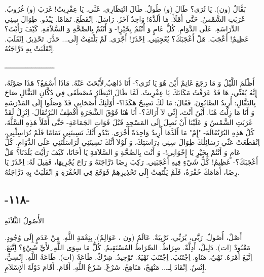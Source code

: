 \documentclass[a5paper]{article}
\begin{document}
بَقَّالٌ (ون). يَا تُرَى؟ طَالَ (و) طُولٌ. طَالَ انْتِظَارِي. غَنَّى. يَا عِفْرِيتُ! غَرَبَ (و) غُرُوبٌ. غَرَبَتِ الشَّمْسُ. حَتَّى أَمْلَأَ. مَا أَلَذَّهُ! وَاحِدٌ آخَرُ. رَاسَلَ. اِنْقَطَعَ. تَمَامًا. يَبْدُو. طِوَالَ سِنِي الدِّرَاسَةِ. عَلَى الدَّوَامِ. كُلُّ عَامٍ وَ أَنْتُمْ بِخَيْرٍ!- وَ أَنْتُمْ بِالصِّحَّةِ وَ السَّلاَمَةِ. كَيْفَ رَأَيْتَ؟ عَظِيمٌ! أَعْجَبَ. هَلْ أَعْجَبَكَ؟ يُعْجِبَنِي. اِحْذَرْ! أَجْرَى. لَمْ يَلْتَفِتْ إِلَى... حَذَّرَ. تَحْذِيرٌ. اِنْقَلَبَ. اِنْقَلَبَتْ بِهِ دَرَّاجَتُهُ. 

ــــــــــــــــــــــــ

أَظْلَمَ اللَّيْلُ وَ مَا رَجَعَ غَانِمٌ أَيْنَ هُوَ يَا تُرَى؟- أَنَا ذَاهِبٌ ِلأَبْحَثَ عَنْهُ. مَاذَا أَسْمَعُ؟ هَذَا صَوْتُهُ، إِنَّهُ يُغَنِّي، هَا قَدْ عَرَفْتُ مَكَانَكَ يَا عِفْرِيتُ. لَمَّا طَالَ انْتِظَارُ مُصْطَفَى فِي دُكَّانِ البَقَّالِ صَاحَ بِالبَقَّالِ: أُرِيدُ الصَّابُونَ. فَقَالَ: مَا لَكَ تَصِيحُ هَكَذَا؟- أُوْلَئِكَ أَصْحَابِي قَدْ وَصَلُوا إِلَى المَدْرَسَةِ وَ أَنَا مَا زِلْتُ هُنَا. أَيْنَ أَنْتَ، إِنِّي لاَ أَرَاكَ؟- أَنَا هُنَا فَوْقَ الشَّجَرَةِ أَقْطِفُ البُرْتُقَالَ- اِنْزِلْ لَقَدْ غَرَبَتِ الشَّمْسُ وَ عَلَيْنَا أَنْ نَصِلَ إِلَى المَسْجِدِ قَبْلَ فَوَاتِ الجَمَاعَةِ- حَتَّى أَمْلَأَ هَذِهِ السَّلَّةَ، كُلْ هَذِهِ البُرْتُقَالَةَ- "إِمْ" مَا أَلَذَّهَا أُرِيدُ وَاحِدَةً أُخْرَى. يَبْدُو أَنَّكَ نَسِيتَنِي تَمَامًا فَلَمْ تُرَاسِلْنِي، اِنْقَطَعَتْ عَنِّي رَسَائِلُكَ طِوَالَ سِنِي دِرَاسَتِكَ، وَ لَوْلاَ أَنَّكَ نَسِيتَنِي لَرَاسَلْتَنِي عَلَى الدَّوَامِ. كُلُّ عَامٍ وَ أَنْتُمْ بِخَيْرٍ يَا إِخْوَانِي!- وَ أَنْتَ بِالصِّحَّةِ وَ السَّلاَمَةِ يَا أَخَانَا، كَيْفَ رَأَيْتَ بَلَدَنَا؟ هَلْ أَعْجَبَكَ؟- عَظِيمٌ! كُلُّ شَيْءٍ فِيهِ أَعْجَبَنِي. رَكِبَ رِضَا دَرَّاجَتَهُ وَ رَاحَ يُجْرِيهَا، فَقِيلَ لَهُ: اِحْذَرْ يَا رِضَا، أَمَامَكَ حُفْرَةٌ، فَلَمْ يَلْتَفِتْ إِلَى تَحْذِيرِهِمْ فَوَقَعَ فِي الحُفْرَةِ وَ انْقَلَبَتْ بِهِ دَرَّاجَتُهُ. 

\subsection{-١١٨-}
الأُصُولُ الثَّلاَثَةِ

أَصْلٌ، أُصُولٌ. رَبَّى، يُرَبِّي، تَرْبِيَةٌ. عَالَمٌ (ون ، عَوَالِمُ). بِنِعْمَةِ اللَّهِ. مِنْ عَدَمٍ إِلَى وُجُودٍ. مَعْبُودٌ (ات). دَلِيلٌ، أَدِلَّةٌ. صِرَاطٌ. الصِّرَاطُ المُسْتَقِيمُ. كُلُّ مَا سِوَى اللَّهِ. ِلأَيِّ شَيْءٍ؟ اِتَّبَعَ. اِتَّبَعَ أَمْرَهُ. نَهْيٌ، مَنَاهٍ. اِجْتَنَبَ. اِجْتَنَبَ نَهْيَهُ. تَوْحِيدٌ. شِرْكٌ. طَاعَةٌ (ات). طَاعَةُ اللَّهِ. إِنْسِيٌّ، إِنْسٌ. اِنْقَادَ لِـ... مَنْهَجٌ، مَنَاهِجُ. شَرْعٌ. شَرْعُ اللَّهِ. أَقَامَ. أَقَامَ دَوْلَةَ الإِسْلاَمِ.
\end{document}

